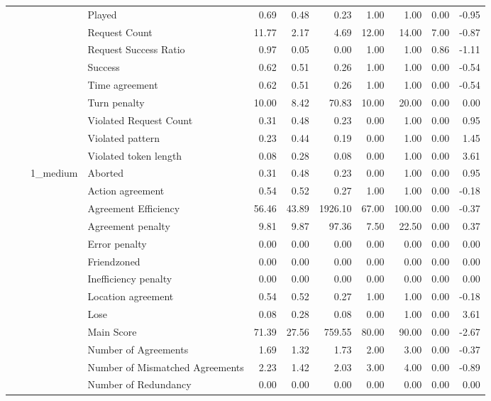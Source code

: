 \begin{tabular}{llllrrrrrrr}
 &  &  & Played & 0.69 & 0.48 & 0.23 & 1.00 & 1.00 & 0.00 & -0.95 \\
 &  &  & Request Count & 11.77 & 2.17 & 4.69 & 12.00 & 14.00 & 7.00 & -0.87 \\
 &  &  & Request Success Ratio & 0.97 & 0.05 & 0.00 & 1.00 & 1.00 & 0.86 & -1.11 \\
 &  &  & Success & 0.62 & 0.51 & 0.26 & 1.00 & 1.00 & 0.00 & -0.54 \\
 &  &  & Time agreement & 0.62 & 0.51 & 0.26 & 1.00 & 1.00 & 0.00 & -0.54 \\
 &  &  & Turn penalty & 10.00 & 8.42 & 70.83 & 10.00 & 20.00 & 0.00 & 0.00 \\
 &  &  & Violated Request Count & 0.31 & 0.48 & 0.23 & 0.00 & 1.00 & 0.00 & 0.95 \\
 &  &  & Violated pattern & 0.23 & 0.44 & 0.19 & 0.00 & 1.00 & 0.00 & 1.45 \\
 &  &  & Violated token length & 0.08 & 0.28 & 0.08 & 0.00 & 1.00 & 0.00 & 3.61 \\
\cline{3-11}
 &  & \multirow[t]{27}{*}{1_medium} & Aborted & 0.31 & 0.48 & 0.23 & 0.00 & 1.00 & 0.00 & 0.95 \\
 &  &  & Action agreement & 0.54 & 0.52 & 0.27 & 1.00 & 1.00 & 0.00 & -0.18 \\
 &  &  & Agreement Efficiency & 56.46 & 43.89 & 1926.10 & 67.00 & 100.00 & 0.00 & -0.37 \\
 &  &  & Agreement penalty & 9.81 & 9.87 & 97.36 & 7.50 & 22.50 & 0.00 & 0.37 \\
 &  &  & Error penalty & 0.00 & 0.00 & 0.00 & 0.00 & 0.00 & 0.00 & 0.00 \\
 &  &  & Friendzoned & 0.00 & 0.00 & 0.00 & 0.00 & 0.00 & 0.00 & 0.00 \\
 &  &  & Inefficiency penalty & 0.00 & 0.00 & 0.00 & 0.00 & 0.00 & 0.00 & 0.00 \\
 &  &  & Location agreement & 0.54 & 0.52 & 0.27 & 1.00 & 1.00 & 0.00 & -0.18 \\
 &  &  & Lose & 0.08 & 0.28 & 0.08 & 0.00 & 1.00 & 0.00 & 3.61 \\
 &  &  & Main Score & 71.39 & 27.56 & 759.55 & 80.00 & 90.00 & 0.00 & -2.67 \\
 &  &  & Number of Agreements & 1.69 & 1.32 & 1.73 & 2.00 & 3.00 & 0.00 & -0.37 \\
 &  &  & Number of Mismatched Agreements & 2.23 & 1.42 & 2.03 & 3.00 & 4.00 & 0.00 & -0.89 \\
 &  &  & Number of Redundancy & 0.00 & 0.00 & 0.00 & 0.00 & 0.00 & 0.00 & 0.00 \\

\end{tabular}
